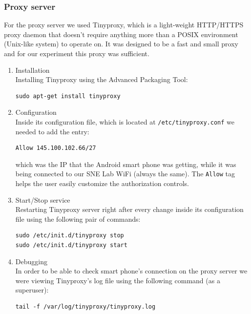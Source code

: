 \documentclass[12pt, a4paper]{report}
\begin{document}
\subsubsection{Proxy server}

For the proxy server we used Tinyproxy, which is a light-weight HTTP/HTTPS proxy daemon that doesn't require anything more than a POSIX environment (Unix-like system) to operate on. It was designed to be a fast and small proxy and for our experiment this proxy was sufficient.

\begin{enumerate}
\item Installation \\
Installing Tinyproxy using the Advanced Packaging Tool:
\begin{lstlisting}[frame=single, breaklines=true]
sudo apt-get install tinyproxy			
\end{lstlisting}	

\item Configuration \\
Inside its configuration file, which is located at \texttt{/etc/tinyproxy.conf} we needed to add the entry:
\begin{lstlisting}[frame=single, breaklines=true]
Allow 145.100.102.66/27			
\end{lstlisting}		
which was the IP that the Android smart phone was getting, while it 			was being connected to our SNE Lab WiFi (always the same). The \texttt{Allow} tag helps the user easily customize the authorization controls. 

\item Start/Stop service \\
Restarting Tinyproxy server right after every change inside its configuration file using the following pair of commands:
\begin{lstlisting}[frame=single, breaklines=true]
sudo /etc/init.d/tinyproxy stop
sudo /etc/init.d/tinyproxy start			
\end{lstlisting}

\item Debugging \\
In order to be able to check smart phone's connection on the proxy server we were viewing Tinyproxy's log file using the following command (as a superuser):
\begin{lstlisting}[frame=single, breaklines=true]
tail -f /var/log/tinyproxy/tinyproxy.log
\end{lstlisting}
\end{enumerate}
\end{document}
